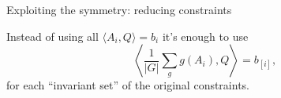 \begin{frame}{Exploiting the symmetry: reducing constraints}

  Instead of using all $\langle A_i, Q \rangle = b_i$ it's enough to use
    \[\left\langle \frac{1}{|G|}\sum_g g(A_i), Q \right\rangle = b_{[i]},\]
    for each ``invariant set'' of the original constraints.
    \\[0.2in]
    \\[0.2in]

\end{frame}




